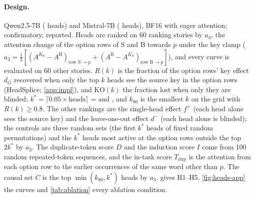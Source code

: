 \paragraph{Design.} Qwen2.5-7B (\HnHeadsQwenSeven{} heads) and Mistral-7B (\HnHeadsMistralSeven{} heads), BF16 with eager attention; \fmtOpt{} confirmatory, \fmtPost{} reported. Heads are ranked on 60 ranking stories by $a_3$, the attention change of the option rows of S and B towards $p$ under the key clamp ($a_3 = \tfrac12[(A^{K_{\mathrm{S}}} - A^{\mathrm{B}})_{\text{row S} \to p} + (A^{\mathrm{B}} - A^{K_{\mathrm{S}}})_{\text{row B} \to p}]$), and every curve is evaluated on 60 other stories. $R(k)$ is the fraction of the option rows' key effect $d_G$ recovered when only the top $k$ heads see the source key in the option rows (HeadSplice; \cref{app:impl}), and $\mathrm{KO}(k)$ the fraction lost when only they are blinded; $k^* = \lceil 0.05 \times \text{heads} \rceil$ = \HkstarQwenSeven{} and \HkstarMistralSeven{}, and $k_{80}$ is the smallest $k$ on the grid with $R(k) \geq 0.8$. The other rankings are the single-head effect $f^+$ (each head alone sees the source key) and the leave-one-out effect $d^-$ (each head alone is blinded); the controls are three random sets (the first $k^*$ heads of fixed random permutations) and the $k^*$ heads most active at the option rows outside the top $2k^*$ by $a_3$. The duplicate-token score $D$ and the induction score $I$ come from 100 random repeated-token sequences, and the in-task score $T_{\mathrm{dup}}$ is the attention from each option row to the earlier occurrences of the same word other than $p$. The causal set $C$ is the top $\min(k_{80}, k^*)$ heads by $a_3$.  gives H1--H5, \cref{fig:heads-app} the curves and \cref{tab:ablation} every ablation condition.

\begin{table}[!ht]
\centering
\small
\caption{\textbf{Reader heads and the second hop} (preregistration H, part (a); \fmtOpt{}, 60 held-out stories, BF16). $R(k^*)$, $\mathrm{KO}(k^*)$: fraction of the option rows' key effect recovered when only the top $k^*$ heads by $a_3$ see the source key, or lost when only they are blinded. $\rho_K$: $\mathrm{ID}_K$ under mean-ablation of these heads at the option rows, relative to no ablation. $C$: the top heads by $a_3$ that carry 80\% of the read. $r_{\mathrm{ans}}$: fraction of the key-clamp effect removed when only the answer row gets the option rows' base keys and values; $r_{\mathrm{other}}$, $r_{\mathrm{all}}$: the same for every other later row and for all rows. 95\% bootstrap CIs over stories. The last row is H5's secondary contrast, reported, not scored.}
\label{tab:heads}

\end{table}

